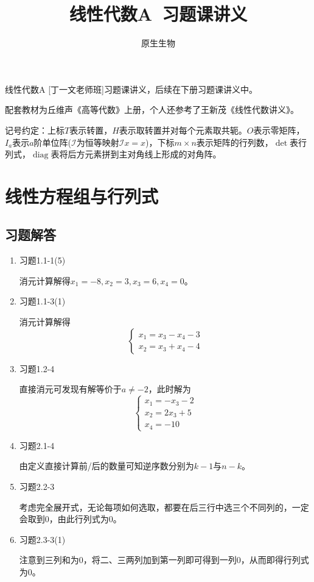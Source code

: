 \documentclass[a4paper,UTF8,fontset=windows]{ctexart}
\title{\textbf{线性代数A\ 习题课讲义}}
\author{原生生物}
\date{}
\DeclareMathOperator{\diag}{diag}
\newcommand*{\mi}{\mathcal{I}}
\newcommand*{\note}{\noindent *}
\begin{document}
\maketitle

\note 线性代数A [丁一文老师班]习题课讲义，后续在下册习题课讲义中。

\note 配套教材为丘维声《高等代数》上册，个人还参考了王新茂《线性代数讲义》。

\note 记号约定：上标$T$表示转置，$H$表示取转置并对每个元素取共轭。$O$表示零矩阵，$I_a$表示$a$阶单位阵($\mi$为恒等映射$\mi x=x$)，下标$m\times n$表示矩阵的行列数，$\det$表行列式，$\diag$表将后方元素拼到主对角线上形成的对角阵。

\tableofcontents

\newpage
\section{线性方程组与行列式}
\subsection{习题解答}
\begin{enumerate}
    \item 习题1.1-1(5)
    
    消元计算解得$x_1=-8,x_2=3,x_3=6,x_4=0$。

    \item 习题1.1-3(1)
    
    消元计算解得
    $$\begin{cases}x_1=x_3-x_4-3\\x_2=x_3+x_4-4\end{cases}$$

    \item 习题1.2-4
    
    直接消元可发现有解等价于$a\ne-2$，此时解为
    $$\begin{cases}x_1=-x_3-2\\x_2=2x_3+5\\x_4=-10\end{cases}$$

    \item 习题2.1-4
    
    由定义直接计算前/后的数量可知逆序数分别为$k-1$与$n-k$。

    \item 习题2.2-3
    
    考虑完全展开式，无论每项如何选取，都要在后三行中选三个不同列的，一定会取到0，由此行列式为0。

    \item 习题2.3-3(1)
    
    注意到三列和为0，将二、三两列加到第一列即可得到一列0，从而即得行列式为0。
\end{enumerate}
\end{document}
